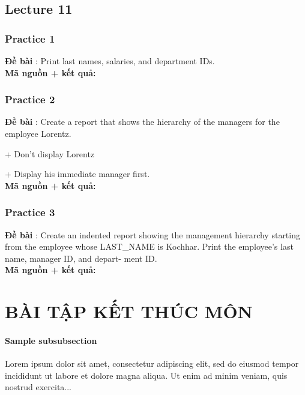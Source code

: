\documentclass[a4paper]{report}
\begin{document}
\section{Lecture 11}
\subsection{Practice 1}
\noindent
\textbf{Đề bài} : Print last names, salaries, and department IDs.
\\

\textbf{Mã nguồn + kết quả: }
\subsection{Practice 2}
\noindent
\textbf{Đề bài} : Create a report that shows the hierarchy of the managers for the employee Lorentz.\par+ Don’t display Lorentz
\par+ Display his immediate manager first.
\\

\textbf{Mã nguồn + kết quả: }
\subsection{Practice 3}
\noindent
\textbf{Đề bài} : Create an indented report showing the management hierarchy starting from the employee whose LAST\_NAME is Kochhar. Print the employee’s last name, manager ID, and depart-
ment ID.
\\

\textbf{Mã nguồn + kết quả: }


\chapter{BÀI TẬP KẾT THÚC MÔN}


\subsubsection{Sample subsubsection}
Lorem ipsum dolor sit amet, consectetur adipiscing elit, sed do 
eiusmod tempor incididunt ut labore et dolore magna aliqua. Ut 
enim ad minim veniam, quis nostrud exercita...
\end{document}
